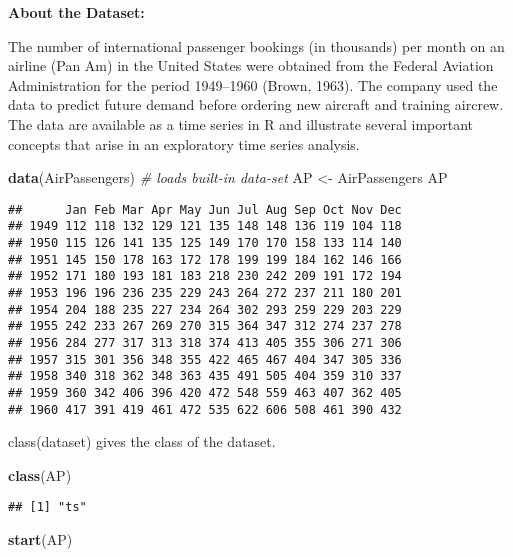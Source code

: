 \documentclass[
]{article}
\author{}
\date{\vspace{-2.5em}}
\newenvironment{Shaded}{\begin{snugshade}}{\end{snugshade}}
\newcommand{\CommentTok}[1]{\textcolor[rgb]{0.56,0.35,0.01}{\textit{#1}}}
\newcommand{\FunctionTok}[1]{\textcolor[rgb]{0.13,0.29,0.53}{\textbf{#1}}}
\newcommand{\NormalTok}[1]{#1}
\newcommand{\OtherTok}[1]{\textcolor[rgb]{0.56,0.35,0.01}{#1}}
\begin{document}
{
\setcounter{tocdepth}{2}
\tableofcontents
}
\textbf{About the Dataset:}

The number of international passenger bookings (in thousands) per month
on an airline (Pan Am) in the United States were obtained from the
Federal Aviation Administration for the period 1949--1960 (Brown, 1963).
The company used the data to predict future demand before ordering new
aircraft and training aircrew. The data are available as a time series
in R and illustrate several important concepts that arise in an
exploratory time series analysis.

\begin{Shaded}
\begin{Highlighting}[]
\FunctionTok{data}\NormalTok{(AirPassengers) }\CommentTok{\# loads built{-}in data{-}set}
\NormalTok{AP }\OtherTok{\textless{}{-}}\NormalTok{ AirPassengers}
\NormalTok{AP}
\end{Highlighting}
\end{Shaded}

\begin{verbatim}
##      Jan Feb Mar Apr May Jun Jul Aug Sep Oct Nov Dec
## 1949 112 118 132 129 121 135 148 148 136 119 104 118
## 1950 115 126 141 135 125 149 170 170 158 133 114 140
## 1951 145 150 178 163 172 178 199 199 184 162 146 166
## 1952 171 180 193 181 183 218 230 242 209 191 172 194
## 1953 196 196 236 235 229 243 264 272 237 211 180 201
## 1954 204 188 235 227 234 264 302 293 259 229 203 229
## 1955 242 233 267 269 270 315 364 347 312 274 237 278
## 1956 284 277 317 313 318 374 413 405 355 306 271 306
## 1957 315 301 356 348 355 422 465 467 404 347 305 336
## 1958 340 318 362 348 363 435 491 505 404 359 310 337
## 1959 360 342 406 396 420 472 548 559 463 407 362 405
## 1960 417 391 419 461 472 535 622 606 508 461 390 432
\end{verbatim}

class(dataset) gives the class of the dataset.

\begin{Shaded}
\begin{Highlighting}[]
\FunctionTok{class}\NormalTok{(AP)}
\end{Highlighting}
\end{Shaded}

\begin{verbatim}
## [1] "ts"
\end{verbatim}

\begin{Shaded}
\begin{Highlighting}[]
\FunctionTok{start}\NormalTok{(AP)}
\end{Highlighting}
\end{Shaded}
\end{document}

